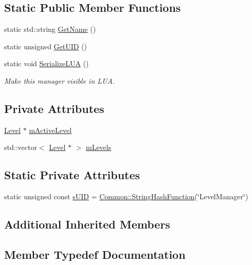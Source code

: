 \subsection*{Static Public Member Functions}
\begin{DoxyCompactItemize}
\item 
static std\+::string \hyperlink{classLevelManager_a7c509ce59ebbac264aceba1a4e4fbc78}{Get\+Name} ()
\item 
static unsigned \hyperlink{classLevelManager_a363e924dbbe0d6111b01839d2bc13ceb}{Get\+U\+ID} ()
\item 
static void \hyperlink{classLevelManager_a7c3b0c1cf3d973247aca9bf01a12fb4a}{Serialize\+L\+UA} ()
\begin{DoxyCompactList}\small\item\em Make this manager visible in L\+UA. \end{DoxyCompactList}\end{DoxyCompactItemize}
\subsection*{Private Attributes}
\begin{DoxyCompactItemize}
\item 
\hyperlink{classLevel}{Level} $\ast$ \hyperlink{classLevelManager_ac3b8e6bc21cba75b517910e5961883ea}{m\+Active\+Level}
\item 
std\+::vector$<$ \hyperlink{classLevel}{Level} $\ast$ $>$ \hyperlink{classLevelManager_a93a04b188e6300894590b7fd92c75750}{m\+Levels}
\end{DoxyCompactItemize}
\subsection*{Static Private Attributes}
\begin{DoxyCompactItemize}
\item 
static unsigned const \hyperlink{classLevelManager_a8273c8c0d95b17552ba0ddeff863195e}{s\+U\+ID} = \hyperlink{namespaceCommon_a994c43a8ea7b03968186a635687a6521}{Common\+::\+String\+Hash\+Function}(\char`\"{}Level\+Manager\char`\"{})
\end{DoxyCompactItemize}
\subsection*{Additional Inherited Members}


\subsection{Member Typedef Documentation}
